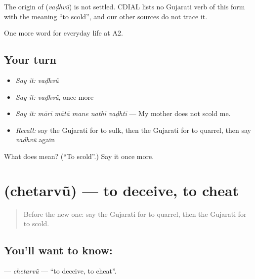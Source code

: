 \begin{cousinweb}
The origin of \textbf{} (\emph{vaḍhvũ}) is not settled. CDIAL lists no Gujarati verb of this form with the meaning \textquotedblleft{}to scold\textquotedblright{}, and our other sources do not trace it.
\end{cousinweb}

\begin{grammarlens}[title={What you've built}]
One more word for everyday life at A2.
\end{grammarlens}

\subsection*{Your turn}
\begin{itemize}
\raggedright
  \item \emph{Say it:} \emph{vaḍhvũ}
  \item \emph{Say it:} \emph{vaḍhvũ}, once more
  \item \emph{Say it:} \emph{mārī mātā mane nathī vaḍhtī} — My mother does not scold me.
  \item \emph{Recall:} say the Gujarati for to sulk, then the Gujarati for to quarrel, then say \emph{vaḍhvũ} again
\end{itemize}

\begin{tcolorbox}[breakable,colback=teal!4,colframe=teal!35!black,title={Before you move on}]
What does  mean? (\textquotedblleft{}To scold\textquotedblright{}.) Say it once more.
\end{tcolorbox}
\section[\texorpdfstring{\gu{છેતરવું} (chetarvũ)}{છેતરવું (chetarvũ)}]{ (chetarvũ) — to deceive, to cheat}

\label{lesson:GU-C268-chetarvu}



\begin{quote}
Before the new one: say the Gujarati for to quarrel, then the Gujarati for to scold.
\end{quote}

\subsection*{You'll want to know: }
\textbf{} — \emph{chetarvũ} — \textquotedblleft{}to deceive, to cheat\textquotedblright{}.

